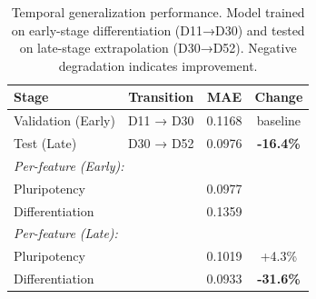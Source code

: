 
\begin{table}[t]
\centering
\caption{Temporal generalization performance. Model trained on early-stage differentiation (D11→D30) and tested on late-stage extrapolation (D30→D52). Negative degradation indicates improvement.}
\label{tab:temporal_extrapolation}
\begin{tabular}{lccc}
\toprule
\textbf{Stage} & \textbf{Transition} & \textbf{MAE} & \textbf{Change} \\
\midrule
Validation (Early) & D11 → D30 & 0.1168 & baseline \\
Test (Late) & D30 → D52 & 0.0976 & \textbf{-16.4\%} \\
\midrule
\multicolumn{2}{l}{\textit{Per-feature (Early):}} \\
\quad Pluripotency & & 0.0977 & \\
\quad Differentiation & & 0.1359 & \\
\multicolumn{2}{l}{\textit{Per-feature (Late):}} \\
\quad Pluripotency & & 0.1019 & +4.3\% \\
\quad Differentiation & & 0.0933 & \textbf{-31.6\%} \\
\bottomrule
\end{tabular}
\end{table}


